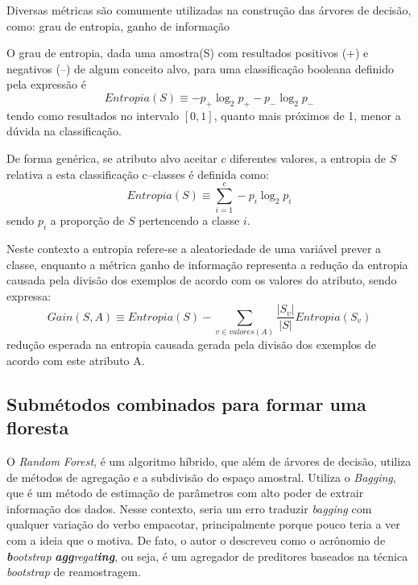 \documentclass{article}
\begin{document}
Diversas métricas são comumente utilizadas na construção das árvores de decisão, como: grau de entropia, ganho de informação

O grau de entropia, dada uma amostra(S) com resultados positivos (+) e negativos (–) de algum conceito alvo, para uma classificação booleana definido pela expressão é
\begin{equation}
    Entropia(S) \equiv -p_+ \log_2 p_+ - p_- \log_2 p_-
\end{equation}
tendo como resultados no intervalo $[0,1]$, quanto mais próximos de 1, menor a dúvida na classificação.

De forma genérica, se atributo alvo aceitar $c$ diferentes valores, a entropia de $S$ relativa a esta classificação c–classes é definida como:
\begin{equation}
    Entropia(S) \equiv \sum_{i=1}^{c} -p_i \log_2 p_i
\end{equation}
sendo $p_i$ a proporção de $S$ pertencendo a classe $i$.

Neste contexto a entropia refere-se a aleatoriedade de uma variável prever a classe,  enquanto a métrica ganho de informação representa a redução da entropia causada pela divisão dos exemplos de acordo com os valores do atributo, sendo expressa:
\begin{equation}
    Gain(S,A) \equiv Entropia(S) - \sum_{v \in valores(A)} \frac{|S_v|}{|S|} Entropia(S_v)
\end{equation}
redução esperada na entropia causada gerada pela divisão dos exemplos de acordo com este atributo A.


\subsection{Submétodos combinados para formar uma floresta}

O \textit{Random Forest}, é um algoritmo híbrido, que além de árvores de decisão, utiliza de métodos de agregação e a subdivisão do espaço amostral. Utiliza o \textit{Bagging}, que é um método de estimação de parâmetros com alto poder de extrair informação dos dados. Nesse contexto, seria um erro traduzir \textit{bagging} com qualquer variação do verbo empacotar, principalmente porque pouco teria a ver com a ideia que o motiva. De fato, o autor \cite{Breiman_1996} o descreveu como o acrônomio de \emph{\textbf{b}ootstrap} \emph{\textbf{agg}regat\textbf{ing}}, ou seja, é um agregador de preditores baseados na técnica \textit{bootstrap} de reamostragem. 
\end{document}
